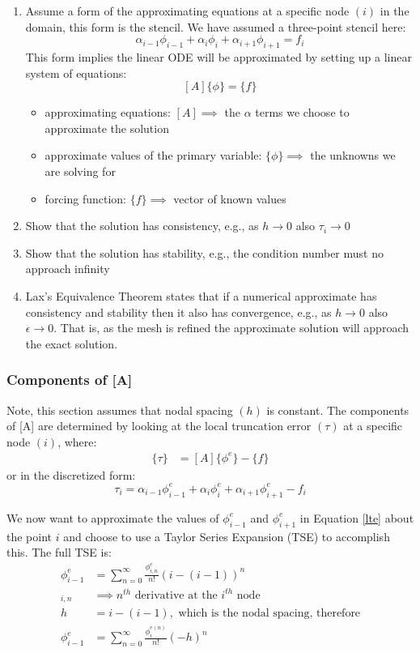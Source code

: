 \documentclass[letterpaper, 10pt, oneside]{article}
\newcommand{\be}{\begin{equation}}
\newcommand{\ee}{\end{equation}}
\newcommand{\bes}{\begin{equation*}}
\newcommand{\ees}{\end{equation*}}
\newcommand{\as}[1]{\begin{align*}#1\end{align*}}
\newcommand{\bi}{\begin{itemize}}
\newcommand{\ei}{\end{itemize}}
\begin{document}
\begin{enumerate}
	\item Assume a form of the approximating equations at a specific node $(i)$ in the domain, this form is the stencil.  We have assumed a three-point stencil here:
	\bes \alpha_{i-1}\phi_{i-1} + \alpha_i \phi_i + \alpha_{i+1}\phi_{i+1} = f_i \ees
	This form implies the linear ODE will be approximated by setting up a linear system of equations: $$[A]\{\phi\}=\{f\}$$ 
	\bi
		\item approximating equations: $[A] \implies $ the $\alpha$ terms we choose to approximate the solution
		\item approximate values of the primary variable: $\{\phi \} \implies$ the unknowns we are solving for
		\item forcing function: $\{f\} \implies$ vector of known values
	\ei
	\item Show that the solution has consistency, e.g., as $h \rightarrow 0$ also $\tau_i \rightarrow 0$
	\item Show that the  solution has stability, e.g., the condition number must no approach infinity
	\item Lax's Equivalence Theorem states that if a numerical approximate has consistency and stability then it also has convergence, e.g., as $h \rightarrow 0$ also $\epsilon \rightarrow 0$.  That is, as the mesh is refined the approximate solution will approach the exact solution.
\end{enumerate}


\subsubsection{Components of [A]}

Note, this section assumes that nodal spacing $(h)$ is constant.  The components of [A] are determined by looking at the local truncation error $(\tau)$ at a specific node $(i)$, where:
\as{\{\tau\} &= [A]\{\phi^e\} - \{f\}}
or in the discretized form:
\be	\tau_i = \alpha_{i-1}\phi_{i-1}^e + \alpha_i \phi_i^e + \alpha_{i+1}\phi_{i+1}^e - f_i \label{lte} \ee

We now want to approximate the values of $\phi_{i-1}^e$ and $\phi_{i+1}^e$ in Equation \ref{lte} about the point $i$ and choose to use a Taylor Series Expansion (TSE) to accomplish this.  The full TSE is: 
\as{
	\phi^e_{i-1} &= \sum\limits_{n=0}^{\infty} \frac{\phi^{e}_{i,n}}{n!}(i - (i-1))^n\\
	_{i,n} &\implies n^{th} \text{ derivative at the } i^{th} \text{ node} \\
	h &= i - (i-1), \text{ which is the nodal spacing, therefore} \\
	\phi^e_{i-1} &= \sum\limits_{n=0}^{\infty} \frac{\phi^{e(n)}_i}{n!}(-h)^n}
\end{document}
